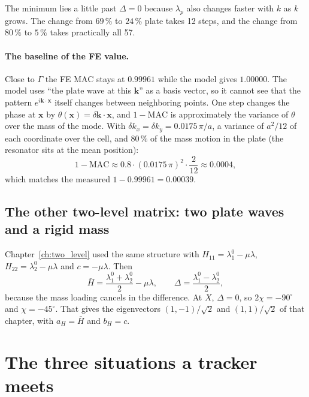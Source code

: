 The minimum lies a little past $\Delta = 0$ because $\lambda_p$ also changes faster
with $k$ as $k$ grows. The change from $69\,\%$ to $24\,\%$ plate takes 12 steps, and
the change from $80\,\%$ to $5\,\%$ takes practically all 57.

\paragraph{The baseline of the FE value.}
Close to $\Gamma$ the FE MAC stays at $0.99961$ while the model gives $1.00000$. The
model uses ``the plate wave at this $\mathbf{k}$'' as a basis vector, so it cannot see
that the pattern $e^{i\mathbf{k}\cdot\mathbf{x}}$ itself changes between neighboring
points. One step changes the phase at $\mathbf{x}$ by $\theta(\mathbf{x}) =
\delta\mathbf{k}\cdot\mathbf{x}$, and $1 - \mathrm{MAC}$ is approximately the variance
of $\theta$ over the mass of the mode. With $\delta k_x = \delta k_y = 0.0175\,\pi/a$,
a variance of $a^2/12$ of each coordinate over the cell, and $80\,\%$ of the mass
motion in the plate (the resonator sits at the mean position):
\begin{equation}
  1 - \mathrm{MAC} \approx 0.8\cdot (0.0175\,\pi)^2\cdot\frac{2}{12} \approx 0.0004 ,
\end{equation}
which matches the measured $1 - 0.99961 = 0.00039$.

\subsection{The other two-level matrix: two plate waves and a rigid mass}
Chapter~\ref{ch:two_level} used the same structure with
$H_{11} = \lambda_1^0 - \mu\lambda$, $H_{22} = \lambda_2^0 - \mu\lambda$ and
$c = -\mu\lambda$. Then
\begin{equation}
  \bar{H} = \frac{\lambda_1^0 + \lambda_2^0}{2} - \mu\lambda, \qquad
  \Delta = \frac{\lambda_1^0 - \lambda_2^0}{2},
\end{equation}
because the mass loading cancels in the difference. At $X$, $\Delta = 0$, so
$2\chi = -90^\circ$ and $\chi = -45^\circ$. That gives the eigenvectors
$(1, -1)/\sqrt{2}$ and $(1, 1)/\sqrt{2}$ of that chapter, with $a_H = \bar{H}$ and
$b_H = c$.

\section{The three situations a tracker meets}

